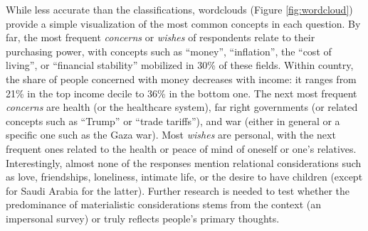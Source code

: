 \documentclass[12pt,english]{article}
\begin{document}
\begin{bibunit}
While less accurate than the classifications, wordclouds (Figure \ref{fig:wordcloud}) provide a simple visualization of the most common concepts in each question. By far, the most frequent \textit{concerns} or \textit{wishes} of respondents relate to their purchasing power, with concepts such as ``money'', ``inflation'', the ``cost of living'', or ``financial stability'' mobilized in 30\% of these fields. Within country, the share of people concerned with money decreases with income: it ranges from 21\% in the top income decile to 36\% in the bottom one. %
The next most frequent \textit{concerns} are health (or the healthcare system), far right governments (or related concepts such as ``Trump'' or ``trade tariffs''), and war (either in general or a specific one such as the Gaza war). Most \textit{wishes} are personal, with the next frequent ones related to the health or peace of mind of oneself or one's relatives. Interestingly, almost none of the responses mention relational considerations such as love, friendships, loneliness, intimate life, or the desire to have children (except for Saudi Arabia for the latter). Further research is needed to test whether the predominance of materialistic considerations stems from the context (an impersonal survey) or truly reflects people's primary thoughts. 


\end{bibunit}
\end{document}
